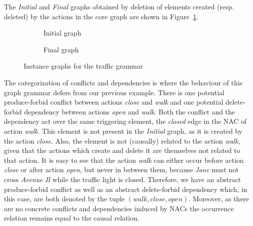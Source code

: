 The \emph{Initial} and \emph{Final} graphs obtained by deletion of elements created (resp. deleted) by the actions in the core graph are shown in Figure~\ref{fig:tests:graphs-traffic}.

\begin{figure}[!ht]
  \centering
  \begin{subfigure}[t]{.5\textwidth}
    \centerline{}
    \caption{Initial graph}
  \end{subfigure}%
  \begin{subfigure}[t]{.5\textwidth}
    \centerline{}
    \caption{Final graph}
  \end{subfigure}
  \caption{Instance graphs for the traffic grammar}\label{fig:tests:graphs-traffic}
\end{figure}

  The categorization of conflicts and dependencies is where the behaviour of this graph grammar defers from our previous example.
  There is one potential produce-forbid conflict between actions \emph{close} and \emph{walk} and one potential delete-forbid dependency between actions \emph{open} and \emph{walk}.
  Both the conflict and the dependency act over the same triggering element, the \emph{closed} edge in the NAC of action \emph{walk}.
  This element is not present in the \emph{Initial} graph, as it is created by the action \emph{close}.
  Also, the element is not (causally) related to the action \emph{walk}, given that the actions which create and delete it are themselves not related to that action.
  It is easy to see that the action \emph{walk} can either occur before action \emph{close} or after action \emph{open}, but never in between them, because \emph{Jane} must not cross \emph{Avenue B} while the traffic light is closed.
  Therefore, we have an abstract produce-forbid conflict as well as an abstract delete-forbid dependency which, in this case, are both denoted by the tuple $(walk,close, open)$. Moreover, as there are no concrete conflicts and dependencies induced by NACs the occurrence relation remains equal to the causal relation.

